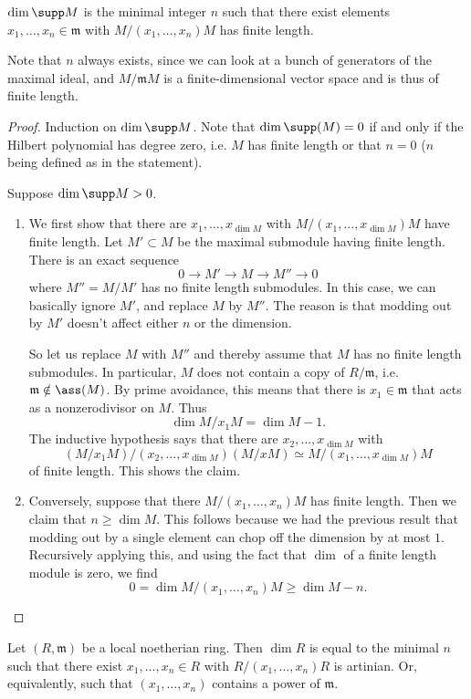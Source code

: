 \begin{proposition} 
$\dim \supp M$ is the minimal integer $n$ such that there exist elements $x_1,
\dots, x_n \in \mathfrak{m}$ with $M/(x_1 , \dots, x_n) M$ has finite length. 
\end{proposition} 
Note that $n$ always exists, since we can look at a bunch of generators of the
maximal ideal, and $M/\mathfrak{m}M $ is a finite-dimensional vector space and
is thus of finite length.
\begin{proof} 
Induction on $\dim \supp M$. Note that $\dim \supp(M)=0$ if and only if the
Hilbert polynomial has degree zero, i.e. $M$ has finite length or that $n=0$
($n$ being defined as in the statement). 

Suppose $\dim \supp M > 0$. \begin{enumerate}
\item  We first show that there are $x_1, \dots, x_{\dim M}$
with $M/(x_1, \dots, x_{\dim M})M$ have finite length. 
Let $M' \subset M$ be the maximal submodule having finite length. There
is an exact sequence
\[ 0 \to M' \to M \to M'' \to 0  \]
where $M'' = M/M'$ has no finite length submodules. In this case, we can
basically ignore $M'$, and replace $M$ by $M''$. The reason is that modding out
by $M'$ doesn't affect either $n$ or the dimension. 

So let us replace $M$ with
$M''$ and thereby assume that $M$ has no finite length submodules. In
particular, $M$ does not contain a copy of $R/\mathfrak{m}$, i.e. $\mathfrak{m}
\notin \ass(M)$. 
By prime avoidance, this means that there is $x_1 \in \mathfrak{m}$ that acts as
a nonzerodivisor on $M$. Thus
\[ \dim M/x_1M = \dim M -1.  \]
The inductive hypothesis says that there are $x_2, \dots, x_{\dim M}$ with
$$(M/x_1 M)/(x_2, \dots, x_{\dim M}) (M/xM) \simeq M/(x_1, \dots, x_{\dim M})M $$
of finite length. This shows the claim.
\item Conversely, suppose that there $M/(x_1, \dots, x_n)M$ has finite length.
Then we claim that $n \geq \dim M$. This follows because we had the previous
result that modding out by a single element can chop off the dimension by at
most $1$. Recursively applying this, and using the fact that $\dim$ of a
finite length module is zero, we find
\[ 0 = \dim M/(x_1 , \dots, x_n )M \geq \dim M -n. \]
\end{enumerate}
\end{proof} 


\begin{corollary} 
Let $(R, \mathfrak{m})$ be a local noetherian ring. Then $\dim R$ is equal to the minimal $n$
such that there exist $x_1, \dots, x_n \in R$ with $R/(x_1, \dots, x_n) R$ is
artinian. Or, equivalently, such that $(x_1, \dots, x_n)$ contains a power of
$\mathfrak{m}$.
\end{corollary}


